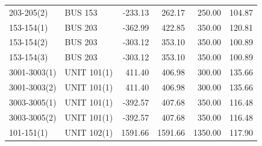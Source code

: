 \documentclass[10pt]{report}
\begin{document}
\begin{table}[H]
{\begin{tabular}{llrrrr}
203-205(2) & BUS 153 & -233.13 & 262.17 & 250.00 & 104.87 \\
153-154(1) & BUS 203 & -362.99 & 422.85 & 350.00 & 120.81 \\
153-154(2) & BUS 203 & -303.12 & 353.10 & 350.00 & 100.89 \\
153-154(3) & BUS 203 & -303.12 & 353.10 & 350.00 & 100.89 \\
3001-3003(1) & UNIT 101(1) & 411.40 & 406.98 & 300.00 & 135.66 \\
3001-3003(2) & UNIT 101(1) & 411.40 & 406.98 & 300.00 & 135.66 \\
3003-3005(1) & UNIT 101(1) & -392.57 & 407.68 & 350.00 & 116.48 \\
3003-3005(2) & UNIT 101(1) & -392.57 & 407.68 & 350.00 & 116.48 \\
101-151(1) & UNIT 102(1) & 1591.66 & 1591.66 & 1350.00 & 117.90 \\
\bottomrule
\end{tabular}}
\end{table}
\end{document}
